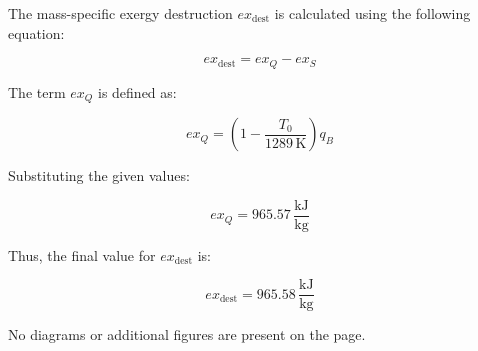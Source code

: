 The mass-specific exergy destruction \( ex_{\text{dest}} \) is calculated using the following equation:  

\[
ex_{\text{dest}} = ex_Q - ex_S
\]

The term \( ex_Q \) is defined as:  

\[
ex_Q = \left( 1 - \frac{T_0}{1289 \, \text{K}} \right) q_B
\]

Substituting the given values:  

\[
ex_Q = 965.57 \, \frac{\text{kJ}}{\text{kg}}
\]

Thus, the final value for \( ex_{\text{dest}} \) is:  

\[
ex_{\text{dest}} = 965.58 \, \frac{\text{kJ}}{\text{kg}}
\]  

No diagrams or additional figures are present on the page.